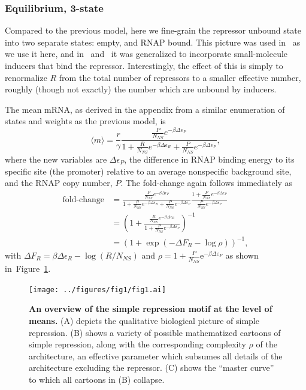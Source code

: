 \documentclass[12pt]{article}%
\newcommand{\fig}[1]{Figure~\ref{#1}}
\begin{document}
\subsubsection{Equilibrium, 3-state}
Compared to the previous model, here we fine-grain the repressor
unbound state into two separate states: empty, and RNAP bound.
This picture was used in~\cite{Garcia2011a} as we use it here,
and in~\cite{Razo-Mejia2018} and~\cite{Chure2019} it was generalized
to incorporate small-molecule inducers that bind the repressor.
Interestingly, the effect of this is simply to renormalize $R$
from the total number of repressors to a smaller effective number,
roughly (though not exactly) the number which are unbound by inducers.

The mean mRNA, as derived in the appendix from a similar
enumeration of states and weights as the previous model, is
\begin{equation}
\langle m \rangle = \frac{r}{\gamma}
\frac{\frac{P}{N_{NS}} e^{-\beta\Delta\epsilon_P}}
        {
        1 + \frac{R}{N_{NS}} e^{-\beta\Delta\epsilon_R}
        + \frac{P}{N_{NS}} e^{-\beta\Delta\epsilon_P}
        },
\end{equation}
where the new variables are $\Delta\epsilon_P$, the difference in
RNAP binding energy to its specific site (the promoter) relative
to an average nonspecific background site, and the RNAP copy
number, $P$. The fold-change again follows immediately as
\begin{align}
\text{fold-change}
&= \frac{\frac{P}{N_{NS}} e^{-\beta\Delta\epsilon_P}}
        {
        1 + \frac{R}{N_{NS}} e^{-\beta\Delta\epsilon_R}
        + \frac{P}{N_{NS}} e^{-\beta\Delta\epsilon_P}
        }
\frac{1 + \frac{P}{N_{NS}} e^{-\beta\Delta\epsilon_P}}
        {\frac{P}{N_{NS}} e^{-\beta\Delta\epsilon_P}}
\\
&= \left(
1 + \frac{\frac{R}{N_{NS}} e^{-\beta\Delta\epsilon_R}}
        {1 + \frac{P}{N_{NS}} e^{-\beta\Delta\epsilon_P}}
\right)^{-1}
\\
&= (1 + \exp(-\Delta F_R - \log\rho))^{-1},
\end{align}
with $\Delta F_R = \beta\Delta\epsilon_R - \log(R/N_{NS})$
and $\rho = 1 + \frac{P}{N_{NS}}\mathrm{e}^{-\beta\Delta\varepsilon_P}$
as shown in~\fig{fig1:means_cartoons}.

\begin{figure}%
\centering
\texttt{[image: ../figures/fig1/fig1.ai]}
\caption{
\textbf{
An overview of the simple repression motif at the level of means.}
(A) depicts the qualitative biological picture of simple repression.
(B) shows a variety of possible mathematized cartoons of simple
repression, along with the corresponding complexity $\rho$ of the
architecture, an effective parameter which subsumes all details
of the architecture excluding the repressor.
(C) shows the ``master curve'' to which all cartoons in (B) collapse.
}
\label{fig1:means_cartoons}
\end{figure}
\end{document}
